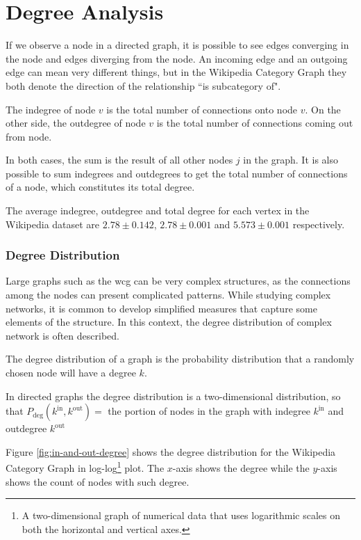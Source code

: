 \section{\hspace*{3pt} Degree Analysis}


If we observe a node in a directed graph, it is possible to see edges converging in the node and edges diverging from the node. An incoming edge and an outgoing edge can mean very different things, but in the Wikipedia Category Graph they both denote the direction of the relationship ``is subcategory of". 

The indegree of node $v$ is the total number of connections onto node $v$.
On the other side, the outdegree of node $v$ is the total number of connections coming out from node.

In both cases, the sum is the result of all other nodes $j$ in the graph. It is also possible to sum indegrees and outdegrees to get the total number of connections of a node, which constitutes its total degree.

The average indegree, outdegree and total degree for each vertex in the Wikipedia dataset are $2.78\pm0.142$, $2.78\pm0.001$ and $5.573\pm0.001$ respectively. 

\subsubsection{\hspace*{3pt}  Degree Distribution}

Large graphs such as the \gls{wcg} can be very complex structures, as the connections among the nodes can present complicated patterns. 
While studying complex networks, it is common to develop simplified measures that capture some elements of the structure. In this context, the degree distribution of complex network is often described. 

The degree distribution of a graph is the probability distribution that a randomly chosen node will have a degree $k$. 

In directed graphs the degree distribution is a two-dimensional distribution, so that $P_{\text{deg}}(k^{\text{in}},k^{\text{out}} ) =$ the portion of nodes in the graph with indegree $k^{\text{in}}$ and outdegree $k^{\text{out}}$

Figure \ref{fig:in-and-out-degree} shows the degree distribution for the Wikipedia Category Graph in log-log\footnote{
A two-dimensional graph of numerical data that uses logarithmic scales on both the horizontal and vertical axes. 
} plot. The $x$-axis shows the degree while the $y$-axis shows the count of nodes with such degree. 


